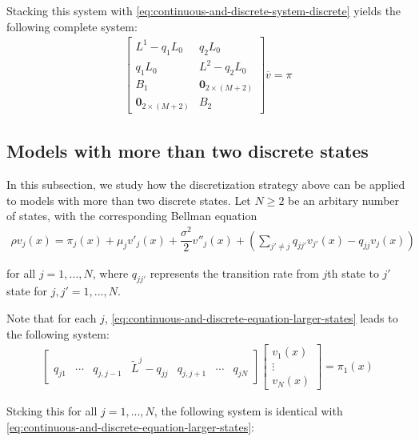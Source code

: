 \documentclass[11pt]{article}
\theoremstyle{definition}
\begin{document}
Stacking this system with \eqref{eq:continuous-and-discrete-system-discrete} yields the following complete system:
\begin{align}
\begin{bmatrix}
{L}^1 - q_1 L_0 & q_2 L_0 \\ 
q_1 L_0 & {L}^2 - q_2 L_0 \\
B_1 & \mathbf{0}_{2 \times (M+2)} \\
\mathbf{0}_{2 \times (M+2)} & B_2 
\end{bmatrix}
\overline{v}
=
\pi
\end{align}

\subsection{Models with more than two discrete states}
In this subsection, we study how the discretization strategy above can be applied to models with more than two discrete states. Let $N \geq 2$ be an arbitary number of states, with the corresponding Bellman equation
\begin{align}
	\rho v_{j}(x) = \pi_j(x)+\mu_j v'_j (x) + \dfrac{\sigma^2}{2} v''_j (x) + 
	\left( \sum_{j' \neq j} q_{jj'} v_{j'}(x)  - q_{jj} v_j(x) \right) \label{eq:continuous-and-discrete-equation-larger-states}  
\end{align}

for all $j=1 ,...,N$, where $q_{jj'}$ represents the transition rate from $j$th state to $j'$ state for $j, j' = 1,...,N$. 

Note that for each $j$, \eqref{eq:continuous-and-discrete-equation-larger-states} leads to the following system:
\begin{align}
\begin{bmatrix}
q_{j1} &  \cdots & q_{j,j-1} & \tilde{L}^j - q_{jj} & q_{j,j+1} & \cdots & q_{jN}
\end{bmatrix}
\begin{bmatrix}
v_1 (x) \\
\vdots \\
v_N (x)
\end{bmatrix}
=
\pi_1 (x)
\end{align}

Stcking this for all $j = 1,...,N$, the following system is identical with \eqref{eq:continuous-and-discrete-equation-larger-states}:
\end{document}
